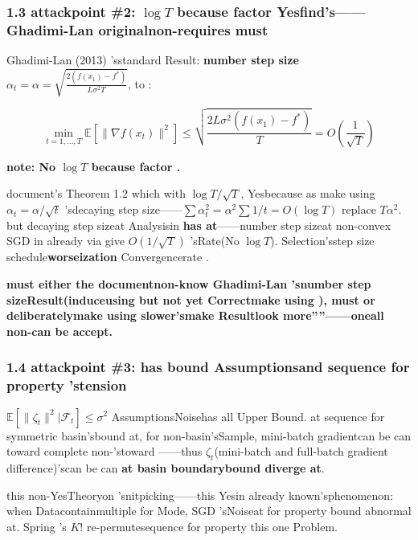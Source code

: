\documentclass[
  12pt,
]{article}
\begin{document}
\subsubsection{\texorpdfstring{1.3 attackpoint  \#2: \(\log T\)
because factor Yesfind's------Ghadimi-Lan
originalnon-requires must }{1.3 attackpoint  \#2: \textbackslash log T because factor Yesfind's------Ghadimi-Lan non-requires must }}\label{ux653bux51fbux70b9-2log-t-ux56e0ux5b50ux662fux81eaux627eux7684ghadimi-lan-ux539fux672cux4e0dux9700ux8981ux5b83}

Ghadimi-Lan (2013) 'sstandard Result: \textbf{number step size}
\(\alpha_t = \alpha = \sqrt{\frac{2(f(x_1)-f^*)}{L\sigma^2 T}}\), to : 

\[\min_{t=1,\ldots,T} \mathbb{E}[\|\nabla f(x_t)\|^2] \leq \sqrt{\frac{2L\sigma^2(f(x_1)-f^*)}{T}} = O\left(\frac{1}{\sqrt{T}}\right)\]

\textbf{note: No \(\log T\) because factor . }

document's Theorem 1.2 which with  \(\log T/\sqrt{T}\), Yesbecause as make using 
\(\alpha_t = \alpha/\sqrt{t}\)
'sdecaying step size------\(\sum \alpha_t^2 = \alpha^2 \sum 1/t = O(\log T)\)
replace
\(T\alpha^2\). but decaying step sizeat Analysisin \textbf{has at}------number step sizeat non-convex
SGD in already via give  \(O(1/\sqrt{T})\) 'sRate(No
\(\log T\)). Selection'sstep size schedule\textbf{worseization }Convergencerate . 

\textbf{must either the documentnon-know Ghadimi-Lan
'snumber step sizeResult(induceusing but not yet Correctmake using ), must or deliberatelymake using slower'smake Resultlook more''''------oneall non-can be accept. }

\subsubsection{1.4 attackpoint 
\#3: has bound Assumptionsand sequence for property 'stension}\label{ux653bux51fbux70b9-3ux6709ux754cux65b9ux5deeux5047ux8bbeux4e0eux6392ux5217ux5bf9ux79f0ux6027ux7684ux5f20ux529b}

\(\mathbb{E}[\|\zeta_t\|^2 | \mathcal{F}_t] \leq \sigma^2\)
AssumptionsNoisehas all Upper Bound. at sequence for symmetric basin'sbound at, for non-basin'sSample, mini-batch
gradientcan be can toward complete non-'stoward ------thus \(\zeta_t\)(mini-batch and 
full-batch gradient difference)'scan be can \textbf{at basin boundarybound diverge at}. 

this non-YesTheoryon 'snitpicking------this Yesin already known'sphenomenon: when Datacontainmultiple for Mode, SGD
'sNoiseat for property bound abnormal at. Spring 's \(K!\)
re-permutesequence for property this one Problem. 
\end{document}
